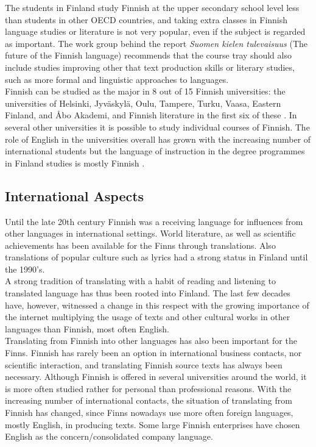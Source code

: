 \begin{multicols}{2}
The students in Finland study Finnish at the upper secondary
school level less than students in other OECD countries, and
taking extra classes in Finnish language studies or literature is not very
popular, even if the subject is regarded as important. The work group behind the report
\textit{\foreignlanguage{finnish}{Suomen kielen tulevaisuus}} (The
future of the Finnish language) \cite{Tulevaisuus2009} recommends that
the course tray should also include studies improving other that text
production skills or literary studies, such as more formal and linguistic
approaches to languages.\\
Finnish can be studied as the major in 8 out of 15 Finnish
universities: the universities of Helsinki, Jyväskylä, Oulu, Tampere,
Turku, Vaasa, Eastern Finland, and Åbo Akademi, and Finnish literature
in the first six of these \cite{hum-ulko}. In several other
universities it is possible to study individual courses of
Finnish. The role of English in the universities overall has grown
with the increasing number of international students but the language
of instruction in the degree programmes in Finland studies is mostly
Finnish \cite{Board}.

\subsection{International Aspects}

Until the late 20th century Finnish was a receiving language for
influences from other languages in international settings. World
literature, as well as scientific achievements has been available for
the Finns through translations. Also translations of popular
culture such as lyrics had a strong status in Finland until the
1990's. \\
A strong tradition of translating with a habit of reading and
listening to translated language has thus been rooted into Finland.
The last few decades have, however, witnessed a change in this respect
with the growing importance of the internet multiplying the usage of
texts and other cultural works in other languages than Finnish, most
often English.\\
Translating from Finnish into other languages has also been important
for the Finns. Finnish has rarely been an option in international
business contacts, nor scientific interaction, and translating Finnish
source texts has always been necessary. Although Finnish is offered in
several universities around the world, it is more often studied rather
for personal than professional reasons.  With the increasing number of
international contacts, the situation of translating from Finnish has
changed, since Finns nowadays use more often foreign languages, mostly
English, in producing texts. Some large Finnish enterprises have
chosen English as the concern/consolidated company language.


\end{multicols}
